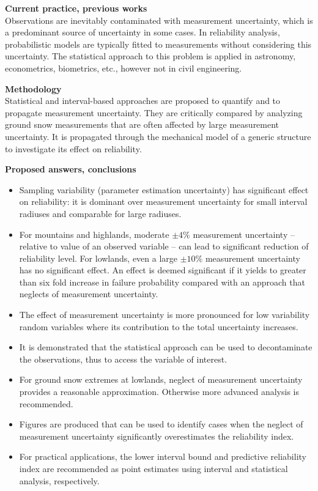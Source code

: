 \begin{enumerate}[leftmargin=*, align=left]
    \textbf{Current practice, previous works} \\
    Observations are inevitably contaminated with measurement uncertainty, which is a predominant source of uncertainty in some cases. In reliability analysis, probabilistic models are typically fitted to measurements without considering this uncertainty. The statistical approach to this problem is applied in astronomy, econometrics, biometrics, etc., however not in civil engineering.

    \textbf{Methodology} \\
    Statistical and interval-based approaches are proposed to quantify and to propagate measurement uncertainty. They are critically compared by analyzing ground snow measurements that are often affected by large measurement uncertainty. It is propagated through the mechanical model of a generic structure to investigate its effect on reliability.

    \textbf{Proposed answers, conclusions}
    \begin{itemize}
      \item Sampling variability (parameter estimation uncertainty) has significant effect on reliability: it is dominant over measurement uncertainty for small interval radiuses and comparable for large radiuses.
      \item For mountains and highlands, moderate $\pm 4\%$ measurement uncertainty -- relative to value of an observed variable -- can lead to significant reduction of reliability level. For lowlands, even a large $\pm 10\%$ measurement uncertainty has no significant effect. An effect is deemed significant if it yields to greater than six fold increase in failure probability compared with an approach that neglects of measurement uncertainty.
      \item The effect of measurement uncertainty is more pronounced for low variability random variables where its contribution to the total uncertainty increases.
      \item It is demonstrated that the statistical approach can be used to decontaminate the observations, thus to access the variable of interest.
      \item For ground snow extremes at lowlands, neglect of measurement uncertainty provides a reasonable approximation. Otherwise more advanced analysis is recommended.
      \item Figures are produced that can be used to identify cases when the neglect of measurement uncertainty significantly overestimates the reliability index. \item For practical applications, the lower interval bound and predictive reliability index are recommended as point estimates using interval and statistical analysis, respectively.
    \end{itemize}


\end{enumerate}
